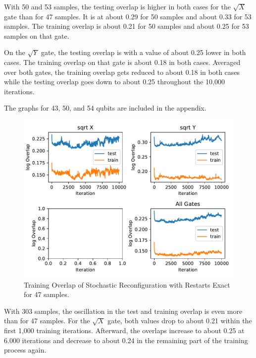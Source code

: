 With 50 and 53 samples, the testing overlap is higher in both cases for the $\sqrt{X}$ gate than for 
47 samples. It is at about 0.29 for 50 samples and about 0.33 for 53 samples. The training overlap is about 
0.21 for 50 samples and about 0.25 for 53 samples on that gate.

On the $\sqrt{Y}$ gate, the testing overlap is with a value of about 0.25 lower in both cases. The 
training overlap on that gate is about 0.18 in both cases. Averaged over both gates, the training 
overlap gets reduced to about 0.18 in both cases while the testing overlap goes down to about 0.25 
throughout the 10,000 iterations.



The graphs for 43, 50, and 54 qubits are included in the appendix.

\begin{figure}[H]
  \centering
  \includegraphics[width=\textwidth]{figures/results/SR-restarts-not-learned/avgOverlap_47.pdf}
  \caption[Training Overlap of Stochastic Reconfiguration with Restarts Exact]{Training 
  Overlap of Stochastic Reconfiguration with Restarts Exact for 47 samples.}
  \label{fig:sr_tvd}
\end{figure}

With 303 samples, the oscillation in the test and training overlap is even more than for 47 samples. 
For the $\sqrt{X}$ gate, both values drop to about 0.21 within the first 1,000 training iterations. 
Afterward, the overlaps increase to about 0.25 at 6.000 iterations and decrease to about 0.24 in the 
remaining part of the training process again.

